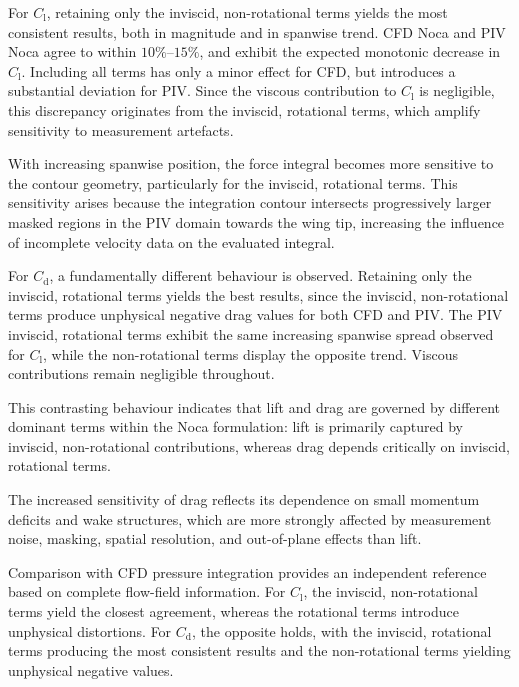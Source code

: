 \documentclass[wes, manuscript]{copernicus}
\begin{document}
For $C_{\mathrm{l}}$, retaining only the inviscid, non-rotational terms 
yields the most consistent results, both in magnitude and in 
spanwise trend. CFD Noca and PIV Noca agree to within $10\%$--$15\%$, and 
exhibit the expected monotonic decrease in $C_{\mathrm{l}}$. Including all 
terms has only a minor effect for CFD, but introduces a substantial 
deviation for PIV. Since the viscous contribution to $C_{\mathrm{l}}$ is 
negligible, this discrepancy originates from the inviscid, rotational 
terms, which amplify sensitivity to measurement artefacts.

With increasing spanwise position, the force integral becomes more 
sensitive to the contour geometry, particularly for the inviscid, 
rotational terms. This sensitivity arises because the integration contour 
intersects progressively larger masked regions in the PIV domain towards 
the wing tip, increasing the influence of incomplete velocity data on the 
evaluated integral.

For $C_{\mathrm{d}}$, a fundamentally different behaviour is observed. 
Retaining only the inviscid, rotational terms yields the best results, since the inviscid, non-rotational terms produce unphysical negative drag values for both CFD and PIV. 
The PIV inviscid, rotational terms exhibit the same increasing spanwise spread observed for 
$C_{\mathrm{l}}$, while the non-rotational terms display the opposite 
trend. Viscous contributions remain negligible throughout.

This contrasting behaviour indicates that lift and drag are governed by 
different dominant terms within the Noca formulation: lift is primarily 
captured by inviscid, non-rotational contributions, whereas drag depends 
critically on inviscid, rotational terms.

The increased sensitivity of drag reflects its dependence on small 
momentum deficits and wake structures, which are more strongly affected by 
measurement noise, masking, spatial resolution, and out-of-plane effects 
than lift.

Comparison with CFD pressure integration provides an independent reference 
based on complete flow-field information. For $C_{\mathrm{l}}$, the 
inviscid, non-rotational terms yield the closest agreement, whereas the 
rotational terms introduce unphysical distortions. For $C_{\mathrm{d}}$, 
the opposite holds, with the inviscid, rotational terms producing the most 
consistent results and the non-rotational terms yielding unphysical 
negative values.
\end{document}
